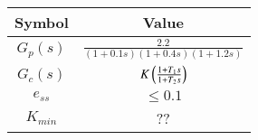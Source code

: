  \begin{tabular}{|c|c|}
        \hline
        \textbf{Symbol}  & \textbf{Value} \\
        \hline
        $G_p(s)$ & $\frac{2.2}{(1+0.1s)(1+0.4s)(1+1.2s)}$\\
         \hline
        $G_c(s)$& $K\left(\frac{1+T_1s}{1+T_2s}\right)$  \\
         \hline
        $e_{ss}$& $\leq 0.1$\\
         \hline
        $K_{min}$& ??\\
        \hline
    \end{tabular}
